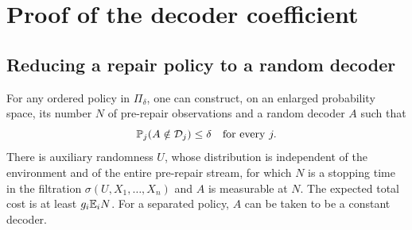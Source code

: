 \section{Proof of the decoder coefficient}\label{sec:proofs}
\subsection{Reducing a repair policy to a random decoder}
\begin{lemma}\label{lem:reduction}
For any ordered policy in $\Pi_\delta$, one can construct, on an enlarged
probability space, its number $N$ of pre-repair observations and a random
decoder $A$ such that
\begin{equation}\label{eq:decodererror}
 \mathbb P_j(A\notin\mathcal D_j)\le\delta\quad\text{for every }j.
\end{equation}
There is auxiliary randomness $U$, whose distribution is independent of the
environment and of the entire pre-repair stream, for which $N$ is a stopping
time in the filtration $\sigma(U,X_1,\ldots,X_n)$ and $A$ is measurable at
$N$. The expected total cost is at least $g_i\mathbb E_iN$.
For a separated policy, $A$ can be taken to be a constant decoder.
\end{lemma}
